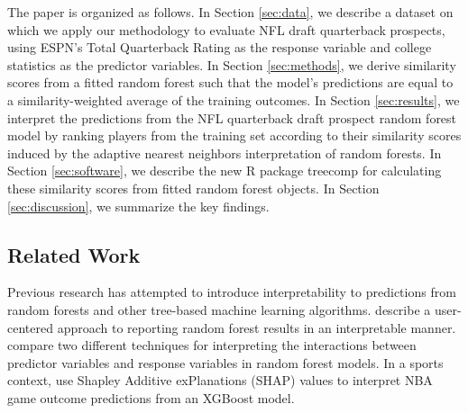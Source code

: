 \documentclass{article}
\begin{document}
The paper is organized as follows. In Section \ref{sec:data}, we describe a dataset on which we apply our methodology to evaluate NFL draft quarterback prospects, using ESPN's Total Quarterback Rating as the response variable and college statistics as the predictor variables. In Section \ref{sec:methods}, we derive similarity scores from a fitted random forest such that the model's predictions are equal to a similarity-weighted average of the training outcomes. In Section \ref{sec:results}, we interpret the predictions from the NFL quarterback draft prospect random forest model by ranking players from the training set according to their similarity scores induced by the adaptive nearest neighbors interpretation of random forests. In Section \ref{sec:software}, we describe the new R package treecomp for calculating these similarity scores from fitted random forest objects. In Section \ref{sec:discussion}, we summarize the key findings.

\subsection{Related Work}

Previous research has attempted to introduce interpretability to predictions from random forests and other tree-based machine learning algorithms. \textcite{petkovic_improving_2018} describe a user-centered approach to reporting random forest results in an interpretable manner. \textcite{aria_comparison_2021} compare two different techniques for interpreting the interactions between predictor variables and response variables in random forest models. In a sports context, \textcite{ouyang_integration_2024} use Shapley Additive exPlanations (SHAP) values to interpret NBA game outcome predictions from an XGBoost model.
\end{document}
